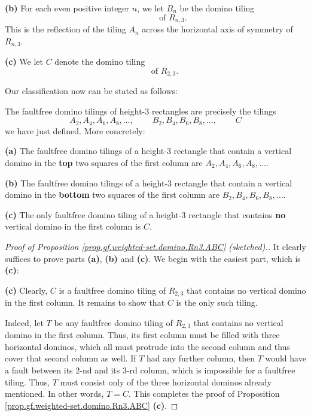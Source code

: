 \begin{fineprint}
\begin{definition}
\textbf{(b)} For each even positive integer $n$, we let $B_{n}$ be the domino
tiling%
\[%
\qquad%
\ \ \ \ \ \ \ \ \ \ \text{of }R_{n,3}.
\]
This is the reflection of the tiling $A_{n}$ across the horizontal axis of
symmetry of $R_{n,3}$. \medskip

\textbf{(c)} We let $C$ denote the domino tiling
\[%
\ \ \ \ \ \ \ \ \ \ \text{of }R_{2,3}.
\]

\end{definition}

Our classification now can be stated as follows:

\begin{proposition}
\label{prop.gf.weighted-set.domino.Rn3.ABC}The faultfree domino tilings of
height-$3$ rectangles are precisely the tilings%
\[
A_{2},A_{4},A_{6},A_{8},\ldots,\ \ \ \ \ \ \ \ \ \ B_{2},B_{4},B_{6}%
,B_{8},\ldots,\ \ \ \ \ \ \ \ \ \ C
\]
we have just defined. More concretely: \medskip

\textbf{(a)} The faultfree domino tilings of a height-$3$ rectangle that
contain a vertical domino in the \textbf{top} two squares of the first column
are $A_{2},A_{4},A_{6},A_{8},\ldots$. \medskip

\textbf{(b)} The faultfree domino tilings of a height-$3$ rectangle that
contain a vertical domino in the \textbf{bottom} two squares of the first
column are $B_{2},B_{4},B_{6},B_{8},\ldots$. \medskip

\textbf{(c)} The only faultfree domino tiling of a height-$3$ rectangle that
contains \textbf{no} vertical domino in the first column is $C$.
\end{proposition}

\begin{proof}
[Proof of Proposition \ref{prop.gf.weighted-set.domino.Rn3.ABC} (sketched).]It
clearly suffices to prove parts \textbf{(a)}, \textbf{(b)} and \textbf{(c)}.
We begin with the easiest part, which is \textbf{(c)}: \medskip

\textbf{(c)} Clearly, $C$ is a faultfree domino tiling of $R_{2,3}$ that
contains no vertical domino in the first column. It remains to show that $C$
is the only such tiling.

Indeed, let $T$ be any faultfree domino tiling of $R_{2,3}$ that contains no
vertical domino in the first column. Thus, its first column must be filled
with three horizontal dominos, which all must protrude into the second column
and thus cover that second column as well. If $T$ had any further column, then
$T$ would have a fault between its $2$-nd and its $3$-rd column, which is
impossible for a faultfree tiling. Thus, $T$ must consist only of the three
horizontal dominos already mentioned. In other words, $T=C$. This completes
the proof of Proposition \ref{prop.gf.weighted-set.domino.Rn3.ABC}
\textbf{(c)}. \medskip


\end{proof}
\end{fineprint}
